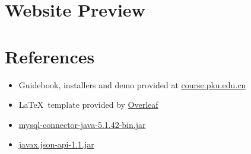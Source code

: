 \section{Website Preview}

\section{References}

\begin{itemize}
	\item Guidebook, installers and demo provided at \url{course.pku.edu.cn}
	\item \LaTeX \, template provided by \href{https://www.overleaf.com/latex/templates/project-template-titlepage/bwmhgfdvvhpw}{Overleaf}
	\item \href{https://dev.mysql.com/downloads/connector/j/}{mysql-connector-java-5.1.42-bin.jar}
	\item \href{https://mvnrepository.com/artifact/javax.json/javax.json-api/1.1}{javax.json-api-1.1.jar}
\end{itemize}


